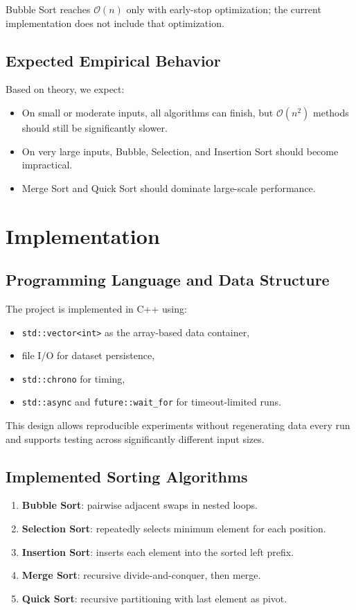 \documentclass[12pt,a4paper]{article}
\begin{document}
\noindent *Bubble Sort reaches $\mathcal{O}(n)$ only with early-stop optimization; the current implementation does not include that optimization.

\subsection{Expected Empirical Behavior}
Based on theory, we expect:
\begin{itemize}
    \item On small or moderate inputs, all algorithms can finish, but $\mathcal{O}(n^2)$ methods should still be significantly slower.
    \item On very large inputs, Bubble, Selection, and Insertion Sort should become impractical.
    \item Merge Sort and Quick Sort should dominate large-scale performance.
\end{itemize}

\section{Implementation}
\subsection{Programming Language and Data Structure}
The project is implemented in C++ using:
\begin{itemize}
    \item \texttt{std::vector<int>} as the array-based data container,
    \item file I/O for dataset persistence,
    \item \texttt{std::chrono} for timing,
    \item \texttt{std::async} and \texttt{future::wait\_for} for timeout-limited runs.
\end{itemize}

This design allows reproducible experiments without regenerating data every run and supports testing across significantly different input sizes.

\subsection{Implemented Sorting Algorithms}
\begin{enumerate}
    \item \textbf{Bubble Sort}: pairwise adjacent swaps in nested loops.
    \item \textbf{Selection Sort}: repeatedly selects minimum element for each position.
    \item \textbf{Insertion Sort}: inserts each element into the sorted left prefix.
    \item \textbf{Merge Sort}: recursive divide-and-conquer, then merge.
    \item \textbf{Quick Sort}: recursive partitioning with last element as pivot.
\end{enumerate}
\end{document}
